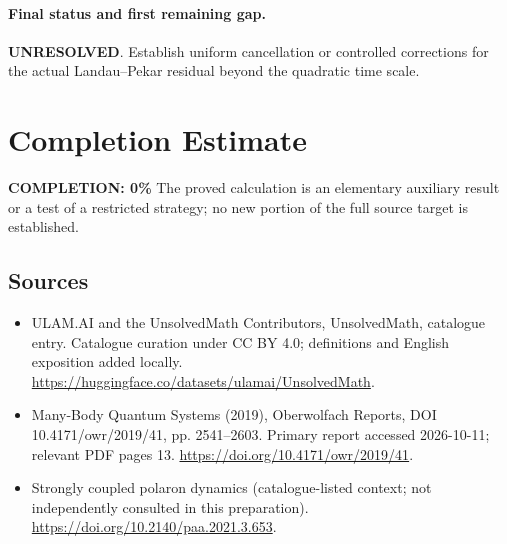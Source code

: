 \documentclass[11pt]{article}
\begin{document}
\paragraph{Final status and first remaining gap.}
\textbf{UNRESOLVED}. Establish uniform cancellation or controlled corrections for the actual Landau–Pekar residual beyond the quadratic time scale.

\section{Completion Estimate}
\noindent\textbf{COMPLETION: 0\%}
The proved calculation is an elementary auxiliary result or a test of a restricted strategy; no new portion of the full source target is established.

\subsection{Sources}
\begin{itemize}
\item[\hypertarget{source:statement:1}{S1}] ULAM.AI and the UnsolvedMath Contributors, UnsolvedMath, catalogue entry. Catalogue curation under CC BY 4.0; definitions and English exposition added locally.
\url{https://huggingface.co/datasets/ulamai/UnsolvedMath}.
\item[\hypertarget{source:statement:2}{S2}] Many-Body Quantum Systems (2019), Oberwolfach Reports, DOI 10.4171/owr/2019/41, pp. 2541--2603. Primary report accessed 2026-10-11; relevant PDF pages 13.
\url{https://doi.org/10.4171/owr/2019/41}.
\item[\hypertarget{source:statement:3}{S3}] Strongly coupled polaron dynamics (catalogue-listed context; not independently consulted in this preparation).
\url{https://doi.org/10.2140/paa.2021.3.653}.
\end{itemize}
\label{end:statement}
\end{document}
